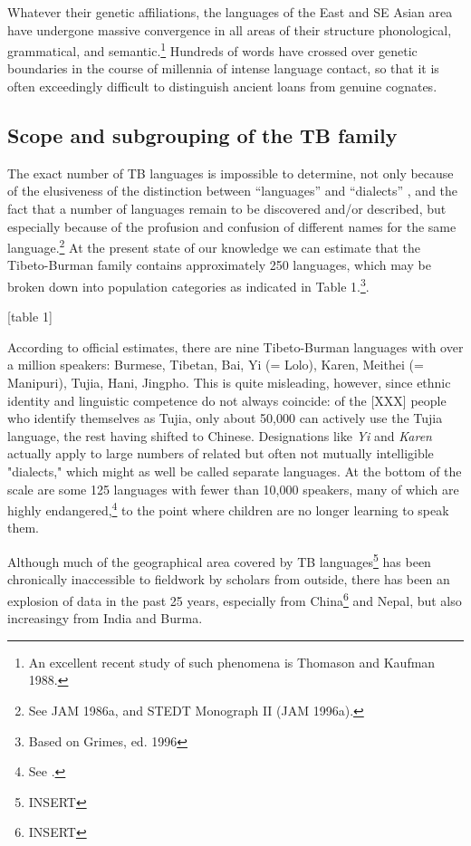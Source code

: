 Whatever their genetic affiliations, the languages of the East and SE Asian area have undergone massive convergence in all areas of their structure  phonological, grammatical, and semantic.\footnote{An excellent recent study of such phenomena is Thomason and Kaufman 1988.}  Hundreds of words have crossed over genetic boundaries in the course of millennia of intense language contact, so that it is often exceedingly difficult to distinguish ancient loans from genuine cognates.

\subsection{Scope and subgrouping of the TB family}

The exact number of TB languages is impossible to determine, not only because of the elusiveness of the distinction between “languages” and “dialects” , and the fact that a number of languages remain to be discovered and/or described, but especially because of the profusion and confusion of different names for the same language.\footnote{See JAM 1986a, and STEDT Monograph II (JAM 1996a).} At the present state of our knowledge we can estimate that the Tibeto-Burman family contains approximately 250 languages, which may be broken down into population categories as indicated in Table 1.\footnote{Based on Grimes, ed. 1996}.

[table 1]

According to official estimates, there are nine Tibeto-Burman languages with over a million speakers: Burmese, Tibetan, Bai, Yi (= Lolo), Karen, Meithei (= Manipuri), Tujia, Hani, Jingpho. This is quite misleading, however, since ethnic identity and linguistic competence do not always coincide: of the [XXX] people who identify themselves as Tujia, only about 50,000 can actively use the Tujia language, the rest having shifted to Chinese. Designations like {\it Yi} and {\it Karen} actually apply to large numbers of related but often not mutually intelligible "dialects," which might as well be called separate languages. At the bottom of the scale are some 125 languages with fewer than 10,000 speakers, many of which are highly endangered,\footnote{See \citealt{Matisoff1991b}.} to the point where children are no longer learning to speak them.

Although much of the geographical area covered by TB languages\footnote{INSERT} has been chronically inaccessible to fieldwork by scholars from outside, there has been an explosion of data in the past 25 years, especially from China\footnote{INSERT} and Nepal, but also increasingy from India and Burma. 

